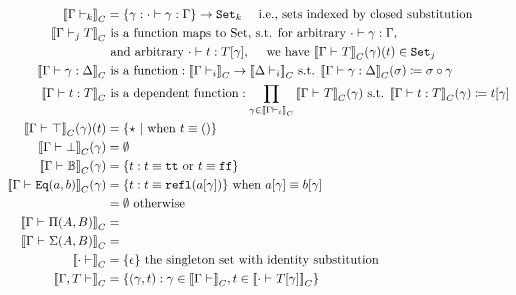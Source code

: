 \begin{align*}
  \denotesC{\goodCtx{\Gm}{k}} &= \{\gm : \goodSub{\cdot}{\gm}{\Gm} \} \to \Set{k} \quad \text{ i.e., sets indexed by closed substitution}\\
  \denotesC{\goodType{\Gm}{T}{j}} & \text{ is a function maps to Set, s.t. for arbitrary } \goodSub{\cdot}{\gm}{\Gm} , \\
  & \text{ and arbitrary } \goodTerm{\cdot}{t}{\sub{T}{\gm}}, \quad \text{ we have } \denotesC{\goodType{\Gm}{T}{}}(\gm)(t) \in \Set{j}  \\ 
  \denotesC{\goodSub{\Gm}{\gm}{\Delta}} & \text{ is a function}: \denotesC{\goodCtx{\Gm}{i}} \to \denotesC{\goodCtx{\Delta}{i}} \text{ s.t. } \denotesC{\goodSub{\Gm}{\gm}{\Delta}}(\sigma) \coloneqq \SubstComp{\sigma}{\gm} \\
  \denotesC{\goodTerm{\Gm}{t}{T}} & \text{ is a dependent function}: \prod_{\gm \in \denotesC{\goodCtx{\Gm}{i}}}\denotesC{\goodType{\Gm}{T}{}}(\gm)  \text{ s.t. } \denotesC{\goodTerm{\Gm}{t}{T}}(\gm) \coloneqq \sub{t}{\gm} \\
  \denotesC{\goodType{\Gm}{\top}{}}(\gm)(t) &= \{\star \ | \text{  when } t \equiv \unit \} \\
  \denotesC{\goodType{\Gm}{\bot}{}}(\gm) &= \emptyset \\
  \denotesC{\goodType{\Gm}{\cB}{}}(\gm) &= \{t : t \equiv \true \text{ or } t \equiv\false \} \\
  \denotesC{\goodType{\Gm}{\TyId{a}{b}}{}}(\gm) &= \{t : t \equiv \eqrefl{\sub{a}{\gm}} \} \text{ when } \sub{a}{\gm} \equiv \sub{b}{\gm} \\ 
  &= \emptyset \text{ otherwise } \\ 
  \denotesC{\goodType{\Gm}{\TyPi{A}{B}}{}} &= \\
  \denotesC{\goodType{\Gm}{\TySigma{A}{B}}{}} &= \\
  \denotesC{\goodCtx{\cdot}{}} &= \{\SubstEmp\} \text{  the singleton set with identity substitution} \\ 
  \denotesC{\goodCtx{\Gm, T}{}} &= \{ (\gamma , t) : \gamma \in \denotesC{\goodCtx{\Gm}{}}, t \in \denotesC{\goodType{\cdot}{\sub{T}{\gm}}{}}  \} \\

\end{align*}
